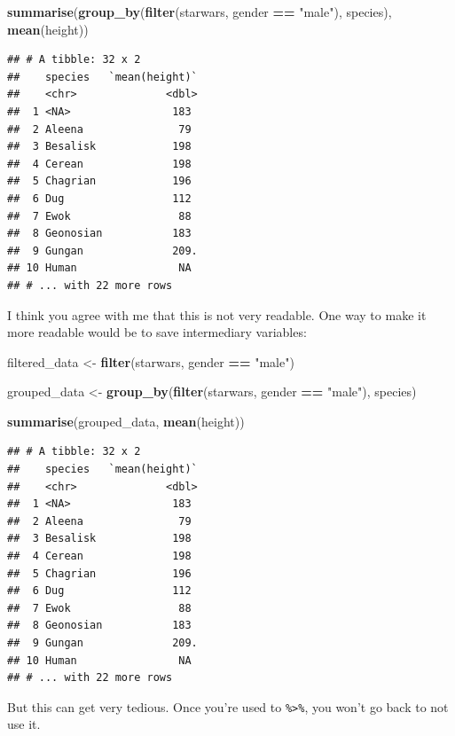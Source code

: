 \documentclass[]{gitbook}
\newenvironment{Shaded}{\begin{snugshade}}{\end{snugshade}}
\newcommand{\KeywordTok}[1]{\textcolor[rgb]{0.13,0.29,0.53}{\textbf{#1}}}
\newcommand{\NormalTok}[1]{#1}
\newcommand{\OperatorTok}[1]{\textcolor[rgb]{0.81,0.36,0.00}{\textbf{#1}}}
\newcommand{\StringTok}[1]{\textcolor[rgb]{0.31,0.60,0.02}{#1}}
\begin{document}
\begin{Shaded}
\begin{Highlighting}[]
\KeywordTok{summarise}\NormalTok{(}\KeywordTok{group_by}\NormalTok{(}\KeywordTok{filter}\NormalTok{(starwars, gender }\OperatorTok{==}\StringTok{ "male"}\NormalTok{), species), }\KeywordTok{mean}\NormalTok{(height))}
\end{Highlighting}
\end{Shaded}

\begin{verbatim}
## # A tibble: 32 x 2
##    species   `mean(height)`
##    <chr>              <dbl>
##  1 <NA>                183 
##  2 Aleena               79 
##  3 Besalisk            198 
##  4 Cerean              198 
##  5 Chagrian            196 
##  6 Dug                 112 
##  7 Ewok                 88 
##  8 Geonosian           183 
##  9 Gungan              209.
## 10 Human                NA 
## # ... with 22 more rows
\end{verbatim}

I think you agree with me that this is not very readable. One way to make it more readable would
be to save intermediary variables:

\begin{Shaded}
\begin{Highlighting}[]
\NormalTok{filtered_data <-}\StringTok{ }\KeywordTok{filter}\NormalTok{(starwars, gender }\OperatorTok{==}\StringTok{ "male"}\NormalTok{)}

\NormalTok{grouped_data <-}\StringTok{ }\KeywordTok{group_by}\NormalTok{(}\KeywordTok{filter}\NormalTok{(starwars, gender }\OperatorTok{==}\StringTok{ "male"}\NormalTok{), species)}

\KeywordTok{summarise}\NormalTok{(grouped_data, }\KeywordTok{mean}\NormalTok{(height))}
\end{Highlighting}
\end{Shaded}

\begin{verbatim}
## # A tibble: 32 x 2
##    species   `mean(height)`
##    <chr>              <dbl>
##  1 <NA>                183 
##  2 Aleena               79 
##  3 Besalisk            198 
##  4 Cerean              198 
##  5 Chagrian            196 
##  6 Dug                 112 
##  7 Ewok                 88 
##  8 Geonosian           183 
##  9 Gungan              209.
## 10 Human                NA 
## # ... with 22 more rows
\end{verbatim}

But this can get very tedious. Once you're used to \texttt{\%\textgreater{}\%}, you won't go back to not use it.
\end{document}
